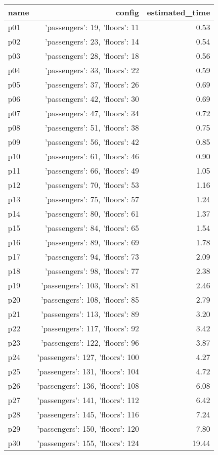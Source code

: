 \documentclass{article}
\begin{document}
                            \begin{center}
                            \scriptsize
                            \begin{tabular}{@{}l|r|r@{}}
                            name & config & estimated\_time\\\midrule
                              p01&{'passengers': 19, 'floors': 11}&0.53\\
  p02&{'passengers': 23, 'floors': 14}&0.54\\
  p03&{'passengers': 28, 'floors': 18}&0.56\\
  p04&{'passengers': 33, 'floors': 22}&0.59\\
  p05&{'passengers': 37, 'floors': 26}&0.69\\
  p06&{'passengers': 42, 'floors': 30}&0.69\\
  p07&{'passengers': 47, 'floors': 34}&0.72\\
  p08&{'passengers': 51, 'floors': 38}&0.75\\
  p09&{'passengers': 56, 'floors': 42}&0.85\\
  p10&{'passengers': 61, 'floors': 46}&0.90\\
  p11&{'passengers': 66, 'floors': 49}&1.05\\
  p12&{'passengers': 70, 'floors': 53}&1.16\\
  p13&{'passengers': 75, 'floors': 57}&1.24\\
  p14&{'passengers': 80, 'floors': 61}&1.37\\
  p15&{'passengers': 84, 'floors': 65}&1.54\\
  p16&{'passengers': 89, 'floors': 69}&1.78\\
  p17&{'passengers': 94, 'floors': 73}&2.09\\
  p18&{'passengers': 98, 'floors': 77}&2.38\\
  p19&{'passengers': 103, 'floors': 81}&2.46\\
  p20&{'passengers': 108, 'floors': 85}&2.79\\
  p21&{'passengers': 113, 'floors': 89}&3.20\\
  p22&{'passengers': 117, 'floors': 92}&3.42\\
  p23&{'passengers': 122, 'floors': 96}&3.87\\
  p24&{'passengers': 127, 'floors': 100}&4.27\\
  p25&{'passengers': 131, 'floors': 104}&4.72\\
  p26&{'passengers': 136, 'floors': 108}&6.08\\
  p27&{'passengers': 141, 'floors': 112}&6.42\\
  p28&{'passengers': 145, 'floors': 116}&7.24\\
  p29&{'passengers': 150, 'floors': 120}&7.80\\
  p30&{'passengers': 155, 'floors': 124}&19.44
                            \end{tabular}
                            \end{center}
                    
\end{document}
